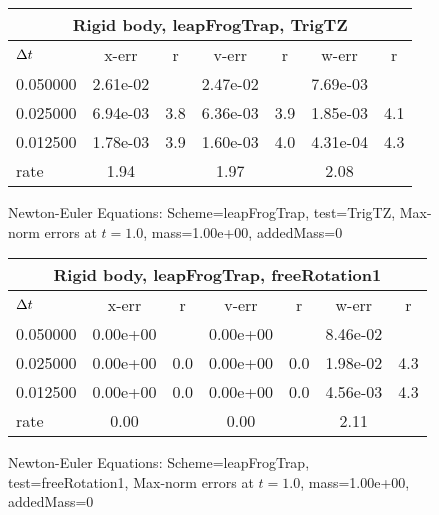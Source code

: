 \begin{figure}[hbt]\tableFont %
\begin{center}
\begin{tabular}{|l|c|c|c|c|c|c|} \hline 
\multicolumn{7}{|c|}{Rigid body, leapFrogTrap, TrigTZ}     \\ \hline
${\Delta t}$    &  x-err   &   r   &  v-err   &   r   &  w-err   &   r   \\ \hline
0.050000 & 2.61e-02 &       & 2.47e-02 &       & 7.69e-03 &         \\ \hline
0.025000 & 6.94e-03 &  3.8  & 6.36e-03 &  3.9  & 1.85e-03 &  4.1    \\ \hline
0.012500 & 1.78e-03 &  3.9  & 1.60e-03 &  4.0  & 4.31e-04 &  4.3    \\ \hline
 rate    &  1.94   &       &  1.97   &       &  2.08   &          \\ \hline
\end{tabular}
\caption{Newton-Euler Equations: Scheme=leapFrogTrap, test=TrigTZ, Max-norm errors at $t= 1.0$, mass=1.00e+00, addedMass=0 }
\label{tab:TestTrigTZ_SchemeleapFrogTrap}
\end{center}
\end{figure} 
\begin{figure}[hbt]\tableFont %
\begin{center}
\begin{tabular}{|l|c|c|c|c|c|c|} \hline 
\multicolumn{7}{|c|}{Rigid body, leapFrogTrap, freeRotation1}     \\ \hline
${\Delta t}$    &  x-err   &   r   &  v-err   &   r   &  w-err   &   r   \\ \hline
0.050000 & 0.00e+00 &       & 0.00e+00 &       & 8.46e-02 &         \\ \hline
0.025000 & 0.00e+00 &  0.0  & 0.00e+00 &  0.0  & 1.98e-02 &  4.3    \\ \hline
0.012500 & 0.00e+00 &  0.0  & 0.00e+00 &  0.0  & 4.56e-03 &  4.3    \\ \hline
 rate    &  0.00   &       &  0.00   &       &  2.11   &          \\ \hline
\end{tabular}
\caption{Newton-Euler Equations: Scheme=leapFrogTrap, test=freeRotation1, Max-norm errors at $t= 1.0$, mass=1.00e+00, addedMass=0 }
\label{tab:TestfreeRotation1_SchemeleapFrogTrap}
\end{center}
\end{figure} 
